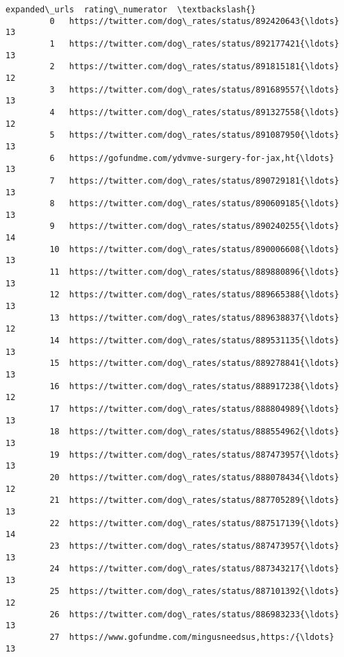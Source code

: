 \documentclass[11pt]{article}
\begin{document}
\begin{Verbatim}[commandchars=\\\{\}]
                                                 expanded\_urls  rating\_numerator  \textbackslash{}
         0   https://twitter.com/dog\_rates/status/892420643{\ldots}                13   
         1   https://twitter.com/dog\_rates/status/892177421{\ldots}                13   
         2   https://twitter.com/dog\_rates/status/891815181{\ldots}                12   
         3   https://twitter.com/dog\_rates/status/891689557{\ldots}                13   
         4   https://twitter.com/dog\_rates/status/891327558{\ldots}                12   
         5   https://twitter.com/dog\_rates/status/891087950{\ldots}                13   
         6   https://gofundme.com/ydvmve-surgery-for-jax,ht{\ldots}                13   
         7   https://twitter.com/dog\_rates/status/890729181{\ldots}                13   
         8   https://twitter.com/dog\_rates/status/890609185{\ldots}                13   
         9   https://twitter.com/dog\_rates/status/890240255{\ldots}                14   
         10  https://twitter.com/dog\_rates/status/890006608{\ldots}                13   
         11  https://twitter.com/dog\_rates/status/889880896{\ldots}                13   
         12  https://twitter.com/dog\_rates/status/889665388{\ldots}                13   
         13  https://twitter.com/dog\_rates/status/889638837{\ldots}                12   
         14  https://twitter.com/dog\_rates/status/889531135{\ldots}                13   
         15  https://twitter.com/dog\_rates/status/889278841{\ldots}                13   
         16  https://twitter.com/dog\_rates/status/888917238{\ldots}                12   
         17  https://twitter.com/dog\_rates/status/888804989{\ldots}                13   
         18  https://twitter.com/dog\_rates/status/888554962{\ldots}                13   
         19  https://twitter.com/dog\_rates/status/887473957{\ldots}                13   
         20  https://twitter.com/dog\_rates/status/888078434{\ldots}                12   
         21  https://twitter.com/dog\_rates/status/887705289{\ldots}                13   
         22  https://twitter.com/dog\_rates/status/887517139{\ldots}                14   
         23  https://twitter.com/dog\_rates/status/887473957{\ldots}                13   
         24  https://twitter.com/dog\_rates/status/887343217{\ldots}                13   
         25  https://twitter.com/dog\_rates/status/887101392{\ldots}                12   
         26  https://twitter.com/dog\_rates/status/886983233{\ldots}                13   
         27  https://www.gofundme.com/mingusneedsus,https:/{\ldots}                13   

\end{Verbatim}
\end{document}

